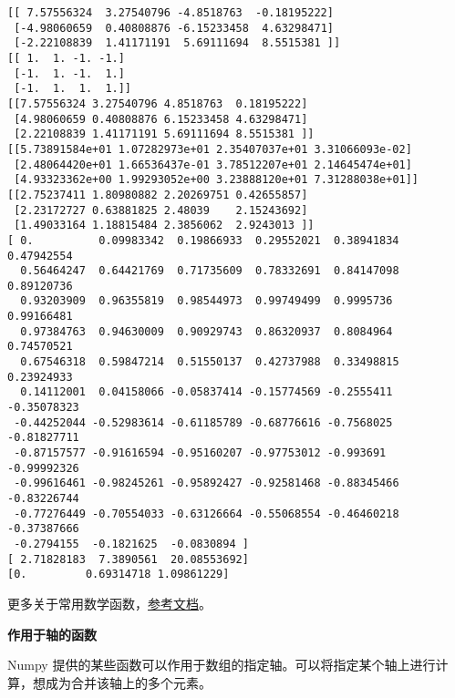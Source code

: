 \documentclass[11pt]{article}
\begin{document}
    \begin{Verbatim}[commandchars=\\\{\}]
[[ 7.57556324  3.27540796 -4.8518763  -0.18195222]
 [-4.98060659  0.40808876 -6.15233458  4.63298471]
 [-2.22108839  1.41171191  5.69111694  8.5515381 ]]
[[ 1.  1. -1. -1.]
 [-1.  1. -1.  1.]
 [-1.  1.  1.  1.]]
[[7.57556324 3.27540796 4.8518763  0.18195222]
 [4.98060659 0.40808876 6.15233458 4.63298471]
 [2.22108839 1.41171191 5.69111694 8.5515381 ]]
[[5.73891584e+01 1.07282973e+01 2.35407037e+01 3.31066093e-02]
 [2.48064420e+01 1.66536437e-01 3.78512207e+01 2.14645474e+01]
 [4.93323362e+00 1.99293052e+00 3.23888120e+01 7.31288038e+01]]
[[2.75237411 1.80980882 2.20269751 0.42655857]
 [2.23172727 0.63881825 2.48039    2.15243692]
 [1.49033164 1.18815484 2.3856062  2.9243013 ]]
[ 0.          0.09983342  0.19866933  0.29552021  0.38941834  0.47942554
  0.56464247  0.64421769  0.71735609  0.78332691  0.84147098  0.89120736
  0.93203909  0.96355819  0.98544973  0.99749499  0.9995736   0.99166481
  0.97384763  0.94630009  0.90929743  0.86320937  0.8084964   0.74570521
  0.67546318  0.59847214  0.51550137  0.42737988  0.33498815  0.23924933
  0.14112001  0.04158066 -0.05837414 -0.15774569 -0.2555411  -0.35078323
 -0.44252044 -0.52983614 -0.61185789 -0.68776616 -0.7568025  -0.81827711
 -0.87157577 -0.91616594 -0.95160207 -0.97753012 -0.993691   -0.99992326
 -0.99616461 -0.98245261 -0.95892427 -0.92581468 -0.88345466 -0.83226744
 -0.77276449 -0.70554033 -0.63126664 -0.55068554 -0.46460218 -0.37387666
 -0.2794155  -0.1821625  -0.0830894 ]
[ 2.71828183  7.3890561  20.08553692]
[0.         0.69314718 1.09861229]

    \end{Verbatim}

    更多关于常用数学函数，\href{https://docs.scipy.org/doc/numpy/reference/routines.math.html}{参考文档}。

    \textbf{作用于轴的函数}

Numpy
提供的某些函数可以作用于数组的指定轴。可以将指定某个轴上进行计算，想成为合并该轴上的多个元素。
\end{document}
